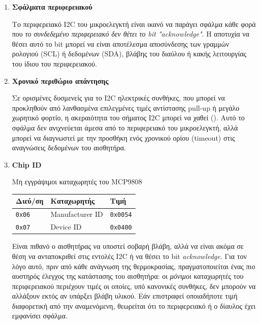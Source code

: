 \documentclass[a4paper,nobib]{tufte-book}
\begin{document}
\begin{enumerate}
	\item \textbf{Σφάλματα περιφερειακού}
	
	Το περιφερειακό \ac{I2C} του μικροελεγκτή είναι ικανό να παράγει σφάλμα κάθε φορά που \emph{το συνδεδεμένο περιφερειακό δεν θέτει το bit "acknowledge"}. Η αποτυχία να θέσει αυτό το bit μπορεί να είναι αποτέλεσμα αποσύνδεσης των γραμμών ρολογιού (\acs{SCL}) ή δεδομένων (\acs{SDA}), βλάβης του διαύλου ή κακής λειτουργίας του ίδιου του περιφερειακού.
	
	\item \textbf{Χρονικό περιθώριο απάντησης}
	
	Σε ορισμένες δυσμενείς για το \ac{I2C} ηλεκτρικές συνθήκες, που μπορεί να προκληθούν από λανθασμένα επιλεγμένες τιμές αντίστασης pull-up ή μεγάλο χωρητικό φορτίο, η ακεραιότητα του σήματος \ac{I2C} μπορεί να χαθεί (). Αυτό το σφάλμα δεν ανιχνεύεται άμεσα από το περιφερειακό του μικροελεγκτή, αλλά μπορεί να διαγνωστεί με την προσθήκη ενός χρονικού ορίου (timeout) στις αναγνώσεις δεδομένων του αισθητήρα.
	
	\item \textbf{Chip ID}
	
	\begin{margintable}
		\centering
		\caption{Μη εγγράψιμοι καταχωρητές του MCP9808}
		\label{tab:mcp9808readonly}
		\begin{tabularx}{\linewidth}{@{}lXl@{}}
			\toprule
			Διεύ/ση & Καταχωρητής & Τιμή \\ \midrule
			\texttt{0x06} & Manufacturer ID & \texttt{0x0054} \\
			\texttt{0x07} & Device ID & \texttt{0x0400} \\ \bottomrule
		\end{tabularx}
	\end{margintable}

	Είναι πιθανό ο αισθητήρας να υποστεί σοβαρή βλάβη, αλλά να είναι ακόμα σε θέση να ανταποκριθεί στις εντολές \ac{I2C} ή να θέσει το bit \emph{acknowledge}. Για τον λόγο αυτό, πριν από κάθε ανάγνωση της θερμοκρασίας, πραγματοποιείται ένας πιο αυστηρός έλεγχος της κατάστασης του αισθητήρα: οι \emph{μόνιμοι} καταχωρητές του περιφερειακού περιέχουν τιμές οι οποίες, υπό κανονικές συνθήκες, δεν μπορούν να αλλάξουν εκτός αν υπάρξει βλάβη υλικού. Εάν επιστραφεί οποιαδήποτε τιμή διαφορετική από την αναμενόμενη, θεωρείται ότι το περιφερειακό ή ο δίαυλος έχει εμφανίσει σφάλμα.
\end{enumerate}
\end{document}
